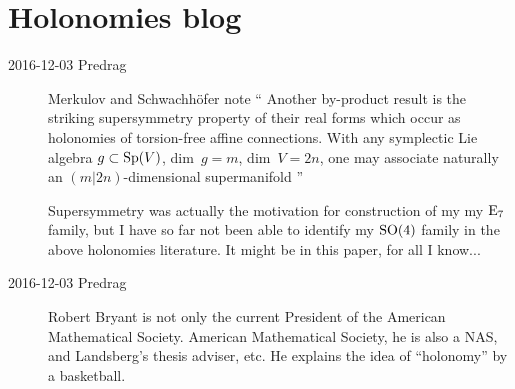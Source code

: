\section{Holonomies blog}
\label{s-HolonomBlog}

\begin{description}

\item[2016-12-03 Predrag]
Merkulov and Schwachh{\"o}fer note
``
Another by-product result is  the striking supersymmetry property of their
real forms which occur as holonomies of torsion-free affine connections. With
any symplectic Lie algebra $g \subset {\rm Sp}(V)$, dim~$g = m$, dim~$V = 2n$, one
may associate naturally an $(m|2n)$-dimensional supermanifold
''

Supersymmetry was actually the motivation for construction of my my ${\rm E}_7$
family, but I have so far not been able to identify my $\textrm{SO}(4)$
family in the above holonomies literature. It might be in this
paper, for all I know...

\item[2016-12-03 Predrag]
 {Robert Bryant}
is not only the current President of the American Mathematical Society.
American Mathematical Society, he is also a NAS, and Landsberg's thesis
adviser, etc. He explains the idea of ``holonomy'' by a
{basketball}.


\end{description}
\renewcommand{\ssp}{a}


\printbibliography[heading=subbibintoc,title={References}]
